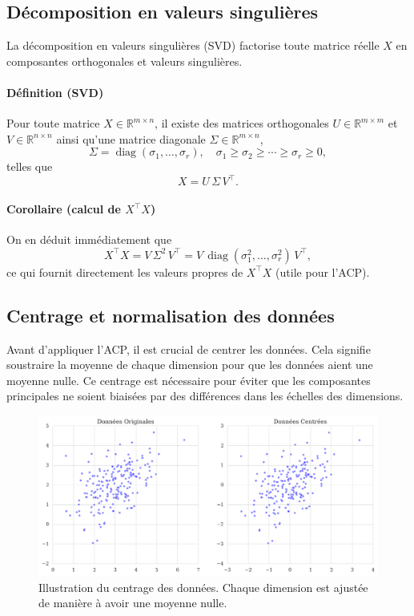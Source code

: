 \documentclass[a4paper,12pt]{report}
\begin{document}
\subsection{Décomposition en valeurs singulières}

La décomposition en valeurs singulières (SVD) factorise toute matrice réelle $X$ en composantes orthogonales et valeurs singulières.

\paragraph*{Définition (SVD)}%
Pour toute matrice $X\in\mathbb{R}^{m\times n}$, il existe des matrices orthogonales 
$U\in\mathbb{R}^{m\times m}$ et $V\in\mathbb{R}^{n\times n}$ ainsi qu’une matrice diagonale 
$\Sigma\in\mathbb{R}^{m\times n}$,  
\[
\Sigma = \operatorname{diag}(\sigma_1,\ldots,\sigma_r),
\quad \sigma_1\ge \sigma_2\ge\cdots\ge \sigma_r\ge 0,
\]
telles que
\[
X = U\,\Sigma\,V^{\top}.
\]

\paragraph*{Corollaire (calcul de $X^{\top}X$)}%
On en déduit immédiatement que
\[
X^{\top}X = V\,\Sigma^{2}\,V^{\top}
= V\,\operatorname{diag}(\sigma_1^{2},\ldots,\sigma_r^{2})\,V^{\top},
\]
ce qui fournit directement les valeurs propres de $X^{\top}X$ (utile pour l’ACP).




\subsection{Centrage et normalisation des données}

Avant d'appliquer l'ACP, il est crucial de centrer les données. Cela signifie soustraire la moyenne de chaque dimension pour que les données aient une moyenne nulle. Ce centrage est nécessaire pour éviter que les composantes principales ne soient biaisées par des différences dans les échelles des dimensions.

\begin{figure}[H]
    \centering
    \includegraphics[width=1.1\textwidth]{centrage_normalisation.png}
    \caption{Illustration du centrage des données. Chaque dimension est ajustée de manière à avoir une moyenne nulle.}
    \label{fig:centrage}
\end{figure}
\end{document}
